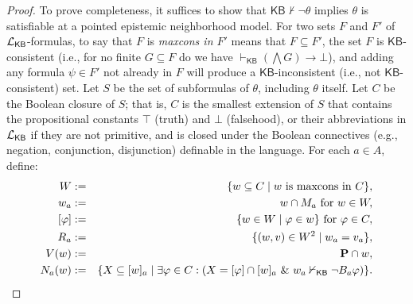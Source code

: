\documentclass[12pt]{article}
\theoremstyle{definition}
\newcommand{\Prop}{{\bf P}}    %
\newcommand{\Lang}{{\cal L}}   %
\newcommand{\KB}{{\mathsf{KB}}}                        %
\begin{document}
\begin{proof}
  To prove completeness, it suffices to show that
  $\KB\nvdash\lnot\theta$ implies $\theta$ is satisfiable at a pointed
  epistemic neighborhood model. For two sets $F$ and $F'$ of
  $\Lang_\KB$-formulas, to say that $F$ is \emph{maxcons in $F'$}
  means that $F\subseteq F'$, the set $F$ is $\KB$-consistent (i.e.,
  for no finite $G\subseteq F$ do we have $\vdash_\KB (\bigwedge
  G)\to\bot$), and adding any formula $\psi\in F'$ not already in $F$
  will produce a $\KB$-inconsistent (i.e., not $\KB$-consistent) set.
  Let $S$ be the set of subformulas of $\theta$, including $\theta$
  itself.  Let $C$ be the Boolean closure of $S$; that is, $C$ is the
  smallest extension of $S$ that contains the propositional constants
  $\top$ (truth) and $\bot$ (falsehood), or their abbreviations in
  $\Lang_\KB$ if they are not primitive, and is closed under the
  Boolean connectives (e.g., negation, conjunction, disjunction)
  definable in the language.  For each $a\in A$, define:
  \begin{eqnarray*}
    W &:=& 
    \{w\subseteq C \mid w \text{ is maxcons in $C$}\}, 
    \\{}
    w_a &:=& w\cap M_a \text{ for } w\in W,
    \\{}
    [\varphi] &:=& \{w\in W\mid \varphi\in w\}
    \text{ for } \varphi\in C,
    \\
    R_a &:=& \{(w,v)\in W^2\mid w_a=v_a\},
    \\{}
    V(w) &:=& \Prop\cap w,
    \\
    N_a(w) &:=&
    \{ X\subseteq[w]_a \mid 
    \exists\varphi\in C:(X=[\varphi]\cap[w]_a
    \text{ \& }
    w_a\nvdash_\KB \lnot B_a\varphi)
    \}.
  \end{eqnarray*}


\end{proof}
\end{document}
